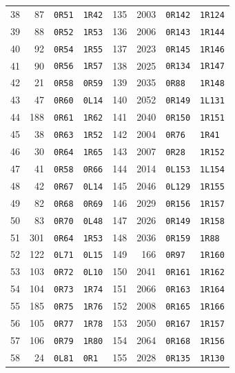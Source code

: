 \begin{longtable}{rrll@{\qquad}rrll}
38 & 87 & \texttt{0R51} & \texttt{1R42} & 135 & 2003 & \texttt{0R142} & \texttt{1R124}\\
39 & 88 & \texttt{0R52} & \texttt{1R53} & 136 & 2006 & \texttt{0R143} & \texttt{1R144}\\
40 & 92 & \texttt{0R54} & \texttt{1R55} & 137 & 2023 & \texttt{0R145} & \texttt{1R146}\\
41 & 90 & \texttt{0R56} & \texttt{1R57} & 138 & 2025 & \texttt{0R134} & \texttt{1R147}\\
42 & 21 & \texttt{0R58} & \texttt{0R59} & 139 & 2035 & \texttt{0R88} & \texttt{1R148}\\
43 & 47 & \texttt{0R60} & \texttt{0L14} & 140 & 2052 & \texttt{0R149} & \texttt{1L131}\\
44 & 188 & \texttt{0R61} & \texttt{1R62} & 141 & 2040 & \texttt{0R150} & \texttt{1R151}\\
45 & 38 & \texttt{0R63} & \texttt{1R52} & 142 & 2004 & \texttt{0R76} & \texttt{1R41}\\
46 & 30 & \texttt{0R64} & \texttt{1R65} & 143 & 2007 & \texttt{0R28} & \texttt{1R152}\\
47 & 41 & \texttt{0R58} & \texttt{0R66} & 144 & 2014 & \texttt{0L153} & \texttt{1L154}\\
48 & 42 & \texttt{0R67} & \texttt{0L14} & 145 & 2046 & \texttt{0L129} & \texttt{1R155}\\
49 & 82 & \texttt{0R68} & \texttt{0R69} & 146 & 2029 & \texttt{0R156} & \texttt{1R157}\\
50 & 83 & \texttt{0R70} & \texttt{0L48} & 147 & 2026 & \texttt{0R149} & \texttt{1R158}\\
51 & 301 & \texttt{0R64} & \texttt{1R53} & 148 & 2036 & \texttt{0R159} & \texttt{1R88}\\
52 & 122 & \texttt{0L71} & \texttt{0L15} & 149 & 166 & \texttt{0R97} & \texttt{1R160}\\
53 & 103 & \texttt{0R72} & \texttt{0L10} & 150 & 2041 & \texttt{0R161} & \texttt{1R162}\\
54 & 104 & \texttt{0R73} & \texttt{1R74} & 151 & 2066 & \texttt{0R163} & \texttt{1R164}\\
55 & 185 & \texttt{0R75} & \texttt{1R76} & 152 & 2008 & \texttt{0R165} & \texttt{1R166}\\
56 & 105 & \texttt{0R77} & \texttt{1R78} & 153 & 2050 & \texttt{0R167} & \texttt{1R157}\\
57 & 106 & \texttt{0R79} & \texttt{1R80} & 154 & 2064 & \texttt{0R168} & \texttt{1R156}\\
58 & 24 & \texttt{0L81} & \texttt{0R1} & 155 & 2028 & \texttt{0R135} & \texttt{1R130}\\

\end{longtable}
